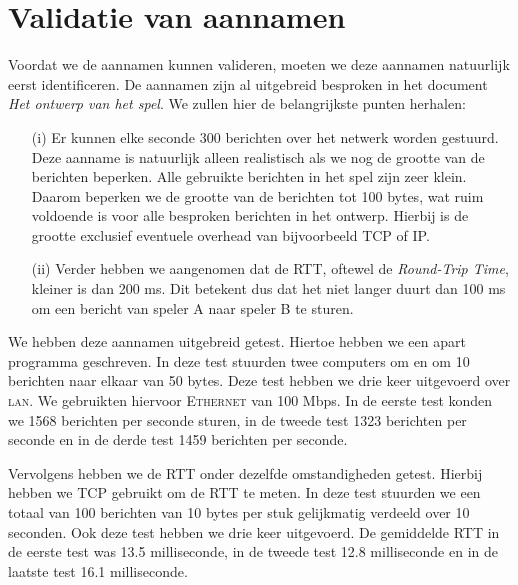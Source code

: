 \section{Validatie van aannamen}
Voordat we de aannamen kunnen valideren, moeten we deze aannamen natuurlijk eerst identificeren. De aannamen zijn al uitgebreid besproken in het document \emph{Het ontwerp van het spel}. We zullen hier de belangrijkste punten herhalen:
\begin{enumerate}
\item[(i)] Er kunnen elke seconde 300 berichten over het netwerk worden gestuurd. Deze aanname is natuurlijk alleen realistisch als we nog de grootte van de berichten beperken. Alle gebruikte berichten in het spel zijn zeer klein. Daarom beperken we de grootte van de berichten tot 100 bytes, wat ruim voldoende is voor alle besproken berichten in het ontwerp. Hierbij is de grootte exclusief eventuele overhead van bijvoorbeeld TCP of IP.
\item[(ii)] Verder hebben we aangenomen dat de RTT, oftewel de \emph{Round-Trip Time}, kleiner is dan 200 ms. Dit betekent dus dat het niet langer duurt dan 100 ms om een bericht van speler A naar speler B te sturen.
\end{enumerate}

We hebben deze aannamen uitgebreid getest. Hiertoe hebben we een apart programma geschreven. In deze test stuurden twee computers om en om 10 berichten naar elkaar van 50 bytes. Deze test hebben we drie keer uitgevoerd over \textsc{lan}. We gebruikten hiervoor \textsc{Ethernet} van 100 Mbps. In de eerste test konden we 1568 berichten per seconde sturen, in de tweede test 1323 berichten per seconde en in de derde test 1459 berichten per seconde.

Vervolgens hebben we de RTT onder dezelfde omstandigheden getest. Hierbij hebben we TCP gebruikt om de RTT te meten. In deze test stuurden we een totaal van 100 berichten van 10 bytes per stuk gelijkmatig verdeeld over 10 seconden. Ook deze test hebben we drie keer uitgevoerd. De gemiddelde RTT in de eerste test was 13.5 milliseconde, in de tweede test 12.8 milliseconde en in de laatste test 16.1 milliseconde.
